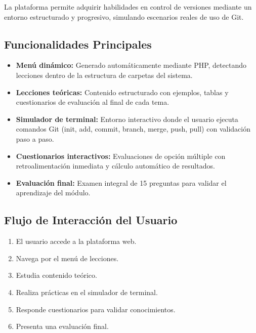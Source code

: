 \documentclass[12pt,a4paper]{article}
\begin{document}
La plataforma permite adquirir habilidades en control de versiones mediante un entorno estructurado y progresivo, simulando escenarios reales de uso de Git.

\subsection{Funcionalidades Principales}

\begin{itemize}
    \item \textbf{Menú dinámico:} Generado automáticamente mediante PHP, detectando lecciones dentro de la estructura de carpetas del sistema.
    
    \item \textbf{Lecciones teóricas:} Contenido estructurado con ejemplos, tablas y cuestionarios de evaluación al final de cada tema.
    
    \item \textbf{Simulador de terminal:} Entorno interactivo donde el usuario ejecuta comandos Git (init, add, commit, branch, merge, push, pull) con validación paso a paso.
    
    \item \textbf{Cuestionarios interactivos:} Evaluaciones de opción múltiple con retroalimentación inmediata y cálculo automático de resultados.
    
    \item \textbf{Evaluación final:} Examen integral de 15 preguntas para validar el aprendizaje del módulo.
\end{itemize}

\subsection{Flujo de Interacción del Usuario}

\begin{enumerate}
    \item El usuario accede a la plataforma web.
    \item Navega por el menú de lecciones.
    \item Estudia contenido teórico.
    \item Realiza prácticas en el simulador de terminal.
    \item Responde cuestionarios para validar conocimientos.
    \item Presenta una evaluación final.
\end{enumerate}
\end{document}
